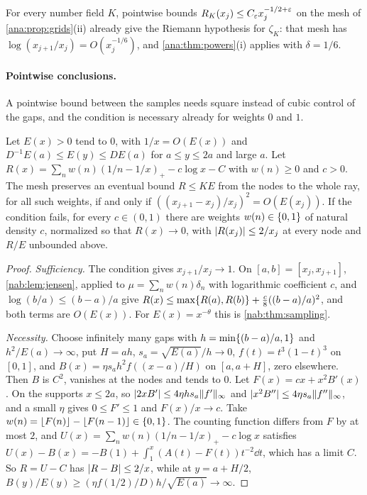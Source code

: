 For every number field $K$, pointwise bounds $R_K(x_j)\le C_\varepsilon x_j^{-1/2+\varepsilon}$ on the mesh of
\cref{ana:prop:grids}(ii) already give the Riemann hypothesis for $\zeta_K$: that mesh has
$\log(x_{j+1}/x_j)=O(x_j^{-1/6})$, and \cref{ana:thm:powers}(i) applies with $\delta=1/6$.

\paragraph{Pointwise conclusions.}
A pointwise bound between the samples needs square instead of cubic control of the gaps, and
the condition is necessary already for weights $0$ and $1$.

\begin{theorem}\label{ana:thm:meshclass}
Let $E(x)>0$ tend to $0$, with $1/x=O(E(x))$ and $D^{-1}E(a)\le E(y)\le DE(a)$ for
$a\le y\le2a$ and large $a$. Let $R(x)=\sum_nw(n)(1/n-1/x)_+-c\log x-C$ with $w(n)\ge0$ and
$c>0$. The mesh preserves an eventual bound $R\le KE$ from the nodes to the whole ray, for all
such weights, if and only if $((x_{j+1}-x_j)/x_j)^2=O(E(x_j))$. If the condition fails, for
every $c\in(0,1)$ there are weights $w(n)\in\{0,1\}$ of natural density $c$, normalized so
that $R(x)\to0$, with $\lvert R(x_j)\rvert\le2/x_j$ at every node and $R/E$ unbounded above.
\end{theorem}

\begin{proof}
\emph{Sufficiency.} The condition gives $x_{j+1}/x_j\to1$. On $[a,b]=[x_j,x_{j+1}]$,
\cref{nab:lem:jensen}, applied to $\mu=\sum_nw(n)\delta_n$ with logarithmic coefficient $c$,
and $\log(b/a)\le(b-a)/a$ give
$R(x)\le\max\{R(a),R(b)\}+\frac c8((b-a)/a)^2$, and both terms are $O(E(x))$. For
$E(x)=x^{-\theta}$ this is \cref{nab:thm:sampling}.

\emph{Necessity.} Choose infinitely many gaps with $h=\min\{(b-a)/a,1\}$ and
$h^2/E(a)\to\infty$, put $H=ah$, $s_a=\sqrt{E(a)}/h\to0$, $f(t)=t^3(1-t)^3$ on $[0,1]$, and
$B(x)=\eta s_ah^2f((x-a)/H)$ on $[a,a+H]$, zero elsewhere. Then $B$ is $C^2$, vanishes at the
nodes and tends to $0$. Let $F(x)=cx+x^2B'(x)$. On the supports $x\le2a$, so
$\lvert2xB'\rvert\le4\eta hs_a\lVert f'\rVert_\infty$ and $\lvert x^2B''\rvert\le4\eta s_a\lVert f''\rVert_\infty$, and a
small $\eta$ gives $0\le F'\le1$ and $F(x)/x\to c$. Take $w(n)=\lfloor F(n)\rfloor-\lfloor F(n-1)\rfloor\in\{0,1\}$.
The counting function differs from $F$ by at most $2$, and
$U(x)=\sum_nw(n)(1/n-1/x)_+-c\log x$ satisfies $U(x)-B(x)=-B(1)+\int_1^x(A(t)-F(t))t^{-2}\dd t$,
which has a limit $C$. So $R=U-C$ has $\lvert R-B\rvert\le2/x$, while at $y=a+H/2$,
$B(y)/E(y)\ge(\eta f(1/2)/D)h/\sqrt{E(a)}\to\infty$.
\end{proof}

